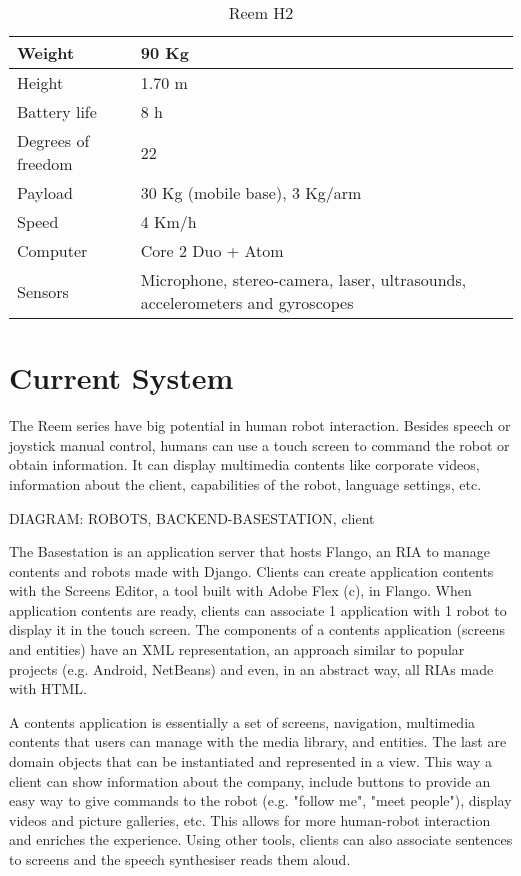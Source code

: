 \begin{table}[ht]
    \centering
    \caption{Reem H2}
    \label{tab:rh2}
    \begin{tabularx}{\linewidth}{| X | X |}
    \hline
    Weight & 90 Kg \\ \hline
    Height & 1.70 m \\ \hline
    Battery life & 8 h \\ \hline
    Degrees of freedom & 22 \\ \hline
    Payload & 30 Kg (mobile base), 3 Kg/arm \\ \hline
    Speed & 4 Km/h \\ \hline
    Computer & Core 2 Duo + Atom \\ \hline
    Sensors & Microphone, stereo-camera, laser, ultrasounds, accelerometers and gyroscopes \\
    \hline
    \end{tabularx}
\end{table}


\section{Current System}
The Reem series have big potential in human robot interaction. 
Besides speech or joystick manual control, humans can use a touch screen to command the robot or obtain information.
It can display multimedia contents like corporate videos, information about the client, capabilities of the robot, language settings, etc.

DIAGRAM: ROBOTS, BACKEND-BASESTATION, client

The Basestation is an application server that hosts Flango, an \ac{RIA} to manage contents and robots made with Django. 
Clients can create application contents with the Screens Editor, a tool built with Adobe Flex (c), in Flango.
When application contents are ready, clients can associate 1 application with 1 robot to display it in the touch screen.
The components of a contents application (screens and entities) have an \ac{XML} representation, an approach similar to popular projects (e.g. Android, NetBeans) and even, in an abstract way, all \acp{RIA} made with \ac{HTML}.

A contents application is essentially a set of screens, navigation, multimedia contents that users can manage with the media library, and entities. 
The last are domain objects that can be instantiated and represented in a view. 
This way a client can show information about the company, include buttons to provide an easy way to give commands to the robot (e.g. "follow me", "meet people"), display videos and picture galleries, etc.
This allows for more human-robot interaction and enriches the experience. 
Using other tools, clients can also associate sentences to screens and the speech synthesiser reads them aloud.

